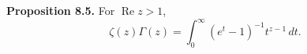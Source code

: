 \textbf{Proposition 8.5.} For $\operatorname{Re} z > 1$,
$$\zeta(z) \Gamma(z) = \int_0^\infty (e^t - 1)^{-1} t^{z-1} \, dt.$$
